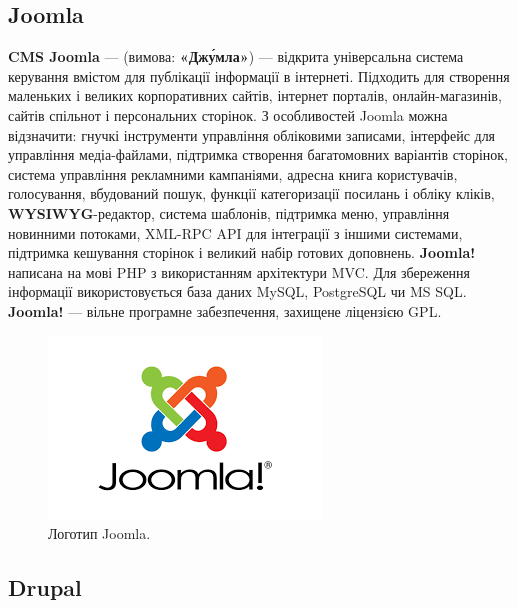 \subsection{Joomla}

\textbf{CMS Joomla} — (вимова: \textbf{«Джу́мла»}) — відкрита універсальна система керування вмістом для публікації інформації в інтернеті. Підходить для створення маленьких і великих корпоративних сайтів, інтернет порталів, онлайн-магазинів, сайтів спільнот і персональних сторінок. З особливостей Joomla можна відзначити: гнучкі інструменти управління обліковими записами, інтерфейс для управління медіа-файлами, підтримка створення багатомовних варіантів сторінок, система управління рекламними кампаніями, адресна книга користувачів, голосування, вбудований пошук, функції категоризації посилань і обліку кліків, \textbf{WYSIWYG}-редактор, система шаблонів, підтримка меню, управління новинними потоками, XML-RPC API для інтеграції з іншими системами, підтримка кешування сторінок і великий набір готових доповнень.
\textbf{Joomla!} написана на мові PHP з використанням архітектури MVC. Для збереження інформації використовується база даних MySQL, PostgreSQL чи MS SQL.
\textbf{Joomla!} — вільне програмне забезпечення, захищене ліцензією GPL.
\begin{figure}[h]
	\centering
	\includegraphics[width=0.5\linewidth]{./images-viktor/joomla.png}
	\caption{
		\centering
		Логотип Joomla.}
\end{figure}

\subsection{Drupal}

